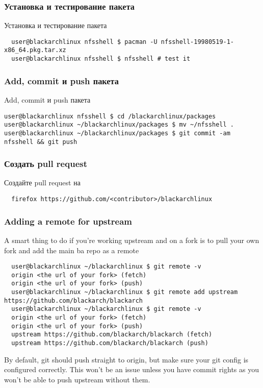 \documentclass[a4paper, oneside, 11pt]{book}
\def\href#1#2{\htmladdnormallink{#2}{#1}}
\begin{document}
\subsubsection{Установка и тестирование пакета}
Установка и тестирование пакета
\begin{lstlisting}
  user@blackarchlinux nfsshell $ pacman -U nfsshell-19980519-1-x86_64.pkg.tar.xz
  user@blackarchlinux nfsshell $ nfsshell # test it
\end{lstlisting}

\subsubsection{Add, commit и push пакета}
Add, commit и push пакета 
\begin{lstlisting}user@blackarchlinux nfsshell $ cd /blackarchlinux/packages
user@blackarchlinux ~/blackarchlinux/packages $ mv ~/nfsshell .
user@blackarchlinux ~/blackarchlinux/packages $ git commit -am nfsshell && git push
\end{lstlisting}

\subsubsection{Создать pull request}
Создайте pull request на \href{https://github.com/}{github.com}
\begin{lstlisting}
  firefox https://github.com/<contributor>/blackarchlinux
\end{lstlisting}

\subsubsection{Adding a remote for upstream}
A smart thing to do if you're working upstream and on a fork is to pull your own fork and add the main ba repo as a remote
\begin{lstlisting}
  user@blackarchlinux ~/blackarchlinux $ git remote -v
  origin <the url of your fork> (fetch)
  origin <the url of your fork> (push)
  user@blackarchlinux ~/blackarchlinux $ git remote add upstream https://github.com/blackarch/blackarch
  user@blackarchlinux ~/blackarchlinux $ git remote -v
  origin <the url of your fork> (fetch)
  origin <the url of your fork> (push)
  upstream https://github.com/blackarch/blackarch (fetch)
  upstream https://github.com/blackarch/blackarch (push)
\end{lstlisting}

By default, git should push straight to origin, but make sure your git config is
configured correctly. This won't be an issue unless you have commit rights as
you won't be able to push upstream without them.
\end{document}
